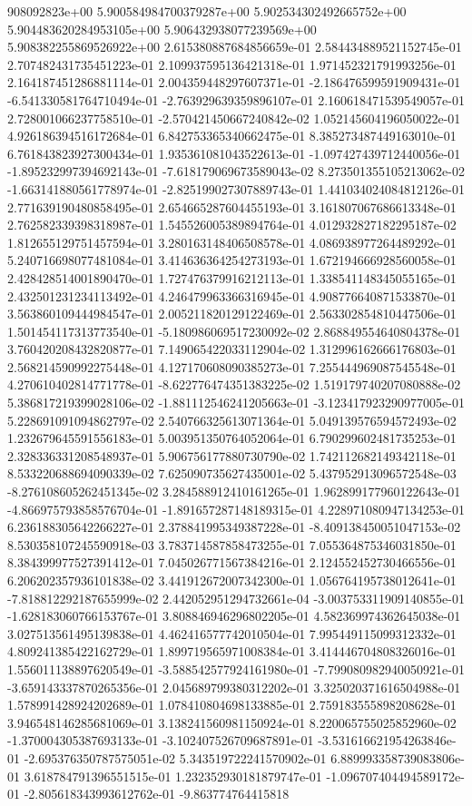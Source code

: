 908092823e+00	5.900584984700379287e+00	5.902534302492665752e+00	5.904483620284953105e+00	5.906432938077239569e+00	5.908382255869526922e+00
2.615380887684856659e-01	2.584434889521152745e-01	2.707482431735451223e-01	2.109937595136421318e-01	1.971452321791993256e-01	2.164187451286881114e-01	2.004359448297607371e-01	-2.186476599591909431e-01	-6.541330581764710494e-01	-2.763929639359896107e-01	2.160618471539549057e-01	2.728001066237758510e-01	-2.570421450667240842e-02	1.052145604196050022e-01	4.926186394516172684e-01	6.842753365340662475e-01	8.385273487449163010e-01	6.761843823927300434e-01	1.935361081043522613e-01	-1.097427439712440056e-01	-1.895232997394692143e-01	-7.618179069673589043e-02	8.273501355105213062e-02	-1.663141880561778974e-01	-2.825199027307889743e-01	1.441034024084812126e-01	2.771639190480858495e-01	2.654665287604455193e-01	3.161807067686613348e-01	2.762582339398318987e-01	1.545526005389894764e-01	4.012932827182295187e-02	1.812655129751457594e-01	3.280163148406508578e-01	4.086938977264489292e-01	5.240716698077481084e-01	3.414636364254273193e-01	1.672194666928560058e-01	2.428428514001890470e-01	1.727476379916212113e-01	1.338541148345055165e-01	2.432501231234113492e-01	4.246479963366316945e-01	4.908776640871533870e-01	3.563860109444984547e-01	2.005211820129122469e-01	2.563302854810447506e-01	1.501454117313773540e-01	-5.180986069517230092e-02	2.868849554640804378e-01	3.760420208432820877e-01	7.149065422033112904e-02	1.312996162666176803e-01	2.568214590992275448e-01	4.127170608090385273e-01	7.255444969087545548e-01	4.270610402814771778e-01	-8.622776474351383225e-02	1.519179740207080888e-02	5.386817219399028106e-02	-1.881112546241205663e-01	-3.123417923290977005e-01	5.228691091094862797e-02	2.540766325613071364e-01	5.049139576594572493e-02	1.232679645591556183e-01	5.003951350764052064e-01	6.790299602481735253e-01	2.328336331208548937e-01	5.906756177880730790e-02	1.742112682149342118e-01	8.533220688694090339e-02	7.625090735627435001e-02	5.437952913096572548e-03	-8.276108605262451345e-02	3.284588912410161265e-01	1.962899177960122643e-01	-4.866975793858576704e-01	-1.891657287148189315e-01	4.228971080947134253e-01	6.236188305642266227e-01	2.378841995349387228e-01	-8.409138450051047153e-02	8.530358107245590918e-03	3.783714587858473255e-01	7.055364875346031850e-01	8.384399977527391412e-01	7.045026771567384216e-01	2.124552452730466556e-01	6.206202357936101838e-02	3.441912672007342300e-01	1.056764195738012641e-01	-7.818812292187655999e-02	2.442052951294732661e-04	-3.003753311909140855e-01	-1.628183060766153767e-01	3.808846946296802205e-01	4.582369974362645038e-01	3.027513561495139838e-01	4.462416577742010504e-01	7.995449115099312332e-01	4.809241385422162729e-01	1.899719565971008384e-01	3.414446704808326016e-01	1.556011138897620549e-01	-3.588542577924161980e-01	-7.799080982940050921e-01	-3.659143337870265356e-01	2.045689799380312202e-01	3.325020371616504988e-01	1.578991428924202689e-01	1.078410804698133885e-01	2.759183555898208628e-01	3.946548146285681069e-01	3.138241560981150924e-01	8.220065755025852960e-02	-1.370004305387693133e-01	-3.102407526709687891e-01	-3.531616621954263846e-01	-2.695376350787575051e-02	5.343519722241570902e-01	6.889993358739083806e-01	3.618784791396551515e-01	1.232352930181879747e-01	-1.096707404494589172e-01	-2.805618343993612762e-01	-9.863774764415818
